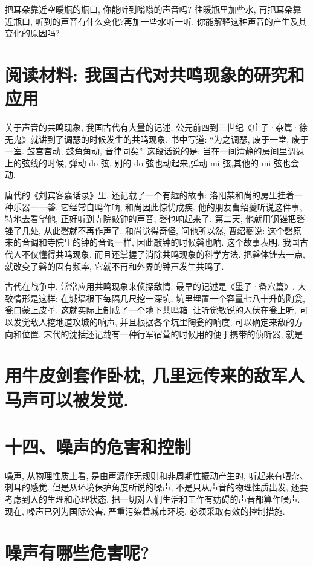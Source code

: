 \documentclass[10pt]{article}
\begin{document}
把耳朵靠近空暖瓶的瓶口, 你能听到嗡嗡的声音吗? 往暖瓶里加些水, 再把耳朵靠近瓶口, 听到的声音有什么变化?再加一些水听一听. 你能解释这种声音的产生及其变化的原因吗?

\section*{阅读材料: 我国古代对共鸣现象的研究和应用}

关于声音的共鸣现象, 我国古代有大量的记述. 公元前四到三世纪《庄子·杂篇·徐无鬼》就讲到了调瑟的时候发生的共鸣现象. 书中写道: “为之调瑟, 废于一堂, 废于一室. 鼓宫宫动, 鼓角角动, 音律同矣”. 这段话说的是: 当在一间清静的房间里调瑟上的弦线的时候, 弹动 do 弦, 别的 do 弦也动起来,弹动 \(\mathrm{{mi}}\) 弦,其他的 \(\mathrm{{mi}}\) 弦也会动.

唐代的《刘宾客嘉话录》里, 还记载了一个有趣的故事: 洛阳某和尚的房里挂着一种乐器一一磬, 它经常自鸣作响, 和尚因此惊忧成疾. 他的朋友曹绍夔听说这件事, 特地去看望他, 正好听到寺院敲钟的声音, 磬也响起来了. 第二天, 他就用钢锉把磬锉了几处, 从此磬就不再作声了. 和尚觉得奇怪, 问他所以然, 曹绍夔说: 这个磬原来的音调和寺院里的钟的音调一样, 因此敲钟的时候磬也响. 这个故事表明, 我国古代人不仅懂得共鸣现象, 而且还掌握了消除共鸣现象的科学方法. 把磬体锉去一点, 就改变了磬的固有频率, 它就不再和外界的钟声发生共鸣了.

古代在战争中, 常常应用共鸣现象来侦探敌情. 最早的记述是《墨子·备穴篇》. 大致情形是这样: 在城墙根下每隔几尺挖一深坑, 坑里埋置一个容量七八十升的陶瓮, 瓮口蒙上皮革. 这就实际上制成了一个地下共鸣箱. 让听觉敏锐的人伏在瓮上听, 可以发觉敌人挖地道攻城的响声, 并且根据各个坑里陶瓮的响度, 可以确定来敌的方向和位置. 宋代的沈括还记载有一种行军宿营的时候用的便于携带的侦听器, 就是

\section*{用牛皮剑套作卧枕, 几里远传来的敌军人马声可以被发觉.}

\section*{十四、噪声的危害和控制}

噪声, 从物理性质上看, 是由声源作无规则和非周期性振动产生的, 听起来有嘈杂、刺耳的感觉. 但是从环境保护角度所说的噪声, 不是只从声音的物理性质出发, 还要考虑到人的生理和心理状态, 把一切对人们生活和工作有妨碍的声音都算作噪声. 现在, 噪声已列为国际公害, 严重污染着城市环境, 必须采取有效的控制措施.

\section*{噪声有哪些危害呢?}
\end{document}
